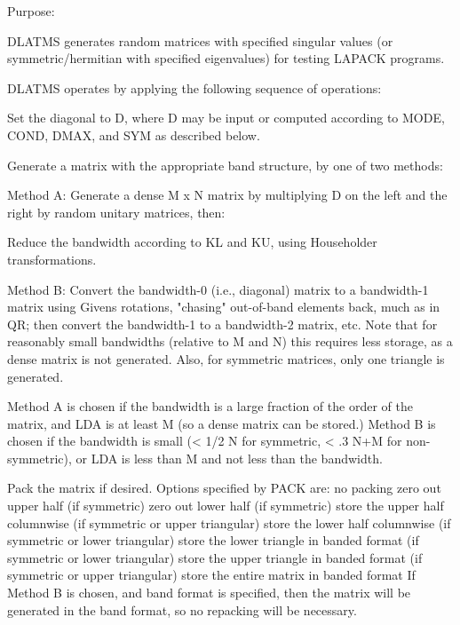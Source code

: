\begin{DoxyParagraph}{Purpose\+: }
\begin{DoxyVerb}    DLATMS generates random matrices with specified singular values
    (or symmetric/hermitian with specified eigenvalues)
    for testing LAPACK programs.

    DLATMS operates by applying the following sequence of
    operations:

      Set the diagonal to D, where D may be input or
         computed according to MODE, COND, DMAX, and SYM
         as described below.

      Generate a matrix with the appropriate band structure, by one
         of two methods:

      Method A:
          Generate a dense M x N matrix by multiplying D on the left
              and the right by random unitary matrices, then:

          Reduce the bandwidth according to KL and KU, using
          Householder transformations.

      Method B:
          Convert the bandwidth-0 (i.e., diagonal) matrix to a
              bandwidth-1 matrix using Givens rotations, "chasing"
              out-of-band elements back, much as in QR; then
              convert the bandwidth-1 to a bandwidth-2 matrix, etc.
              Note that for reasonably small bandwidths (relative to
              M and N) this requires less storage, as a dense matrix
              is not generated.  Also, for symmetric matrices, only
              one triangle is generated.

      Method A is chosen if the bandwidth is a large fraction of the
          order of the matrix, and LDA is at least M (so a dense
          matrix can be stored.)  Method B is chosen if the bandwidth
          is small (< 1/2 N for symmetric, < .3 N+M for
          non-symmetric), or LDA is less than M and not less than the
          bandwidth.

      Pack the matrix if desired. Options specified by PACK are:
         no packing
         zero out upper half (if symmetric)
         zero out lower half (if symmetric)
         store the upper half columnwise (if symmetric or upper
               triangular)
         store the lower half columnwise (if symmetric or lower
               triangular)
         store the lower triangle in banded format (if symmetric
               or lower triangular)
         store the upper triangle in banded format (if symmetric
               or upper triangular)
         store the entire matrix in banded format
      If Method B is chosen, and band format is specified, then the
         matrix will be generated in the band format, so no repacking
         will be necessary.\end{DoxyVerb}
 
\end{DoxyParagraph}

